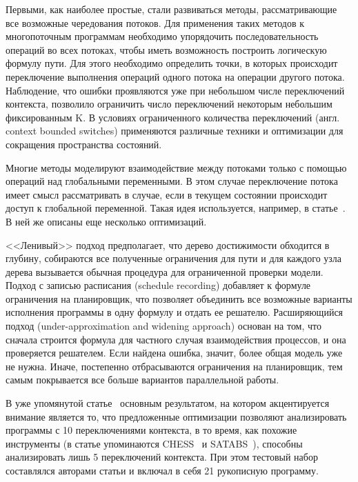 Первыми, как наиболее простые, стали развиваться методы, рассматривающие все возможные чередования потоков.
Для применения таких методов к многопоточным программам необходимо упорядочить последовательность операций во всех потоках, чтобы иметь возможность построить логическую формулу пути.
Для этого необходимо определить точки, в которых происходит переключение выполнения операций одного потока на операции другого потока.
Наблюдение, что ошибки проявляются уже при небольшом числе переключений контекста, позволило ограничить число переключений некоторым небольшим фиксированным K.
В условиях ограниченного количества переключений (англ. context bounded switches) применяются различные техники и оптимизации для сокращения пространства состояний. 

Многие методы моделируют взаимодействие между потоками только с помощью операций над глобальными переменными.
В этом случае переключение потока имеет смысл рассматривать в случае, если в текущем состоянии происходит доступ к глобальной переменной.
Такая идея используется, например, в статье~\cite{Cordeiro:2011}. В ней же описаны еще несколько оптимизаций.

<<Ленивый>> подход предполагает, что дерево достижимости обходится в глубину, собираются все полученные ограничения для пути и для каждого узла дерева вызывается обычная процедура для ограниченной проверки модели.
Подход с записью расписания (schedule recording) добавляет к формуле ограничения на планировщик, что позволяет объединить все возможные варианты исполнения программы в одну формулу и отдать ее решателю.
Расширяющийся подход (under-approximation and widening approach) основан на том, что сначала строится формула для частного случая взаимодействия процессов, и она проверяется решателем.
Если найдена ошибка, значит, более общая модель уже не нужна. Иначе, постепенно отбрасываются ограничения на планировщик, тем самым покрывается все больше вариантов параллельной работы. 

В уже упомянутой статье~\cite{Cordeiro:2011} основным результатом, на котором акцентируется внимание является то, что предложенные оптимизации позволяют анализировать программы с 10 переключениями контекста, в то время, как похожие инструменты (в статье упоминаются CHESS~\cite{Musuvathi:2007} и SATABS~\cite{SATabs}), способны анализировать лишь 5 переключений контекста.
При этом тестовый набор составлялся авторами статьи и включал в себя 21 рукописную программу. 

